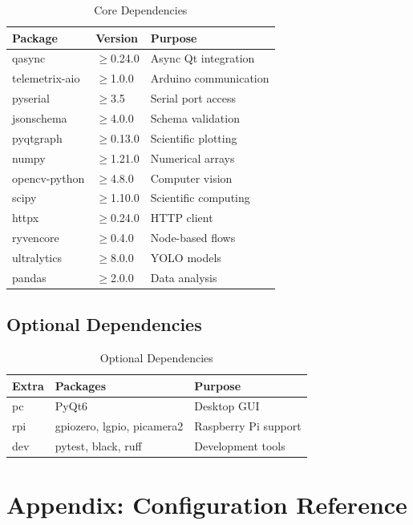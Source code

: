 \documentclass[11pt,a4paper]{article}
\begin{document}
\begin{table}[H]
\centering
\begin{tabular}{@{}lll@{}}
\toprule
\textbf{Package} & \textbf{Version} & \textbf{Purpose} \\
\midrule
qasync & $\geq$0.24.0 & Async Qt integration \\
telemetrix-aio & $\geq$1.0.0 & Arduino communication \\
pyserial & $\geq$3.5 & Serial port access \\
jsonschema & $\geq$4.0.0 & Schema validation \\
pyqtgraph & $\geq$0.13.0 & Scientific plotting \\
numpy & $\geq$1.21.0 & Numerical arrays \\
opencv-python & $\geq$4.8.0 & Computer vision \\
scipy & $\geq$1.10.0 & Scientific computing \\
httpx & $\geq$0.24.0 & HTTP client \\
ryvencore & $\geq$0.4.0 & Node-based flows \\
ultralytics & $\geq$8.0.0 & YOLO models \\
pandas & $\geq$2.0.0 & Data analysis \\
\bottomrule
\end{tabular}
\caption{Core Dependencies}
\end{table}

\subsection{Optional Dependencies}

\begin{table}[H]
\centering
\begin{tabular}{@{}lll@{}}
\toprule
\textbf{Extra} & \textbf{Packages} & \textbf{Purpose} \\
\midrule
pc & PyQt6 & Desktop GUI \\
rpi & gpiozero, lgpio, picamera2 & Raspberry Pi support \\
dev & pytest, black, ruff & Development tools \\
\bottomrule
\end{tabular}
\caption{Optional Dependencies}
\end{table}

\section{Appendix: Configuration Reference}
\end{document}
